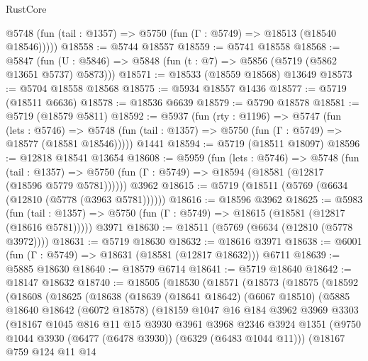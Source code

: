 \begin{lexlean}{RustCore}
\begin{coremodule}
      @5748 (fun (tail : @1357) => @5750 (fun (Γ : @5749) => @18513 (@18540 @18546)))))
@18558 := @5744 @18557
@18559 := @5741 @18558
@18568 := @5847
    (fun (U : @5846) => @5848 (fun (t : @7) => @5856 (@5719 (@5862 @13651 @5737) @5873)))
@18571 := @18533 (@18559 @18568) @13649
@18573 := @5704 @18558 @18568
@18575 := @5934 @18557 @1436
@18577 := @5719 (@18511 @6636)
@18578 := @18536 @6639
@18579 := @5790 @18578
@18581 := @5719 (@18579 @5811)
@18592 := @5937
    (fun (rty : @1196) =>
    @5747
      (fun (lets : @5746) =>
      @5748 (fun (tail : @1357) => @5750 (fun (Γ : @5749) => @18577 (@18581 @18546)))))
    @1441
@18594 := @5719 (@18511 @18097)
@18596 := @12818 @18541 @13654
@18608 := @5959
    (fun (lets : @5746) =>
    @5748
      (fun (tail : @1357) =>
      @5750 (fun (Γ : @5749) => @18594 (@18581 (@12817 (@18596 @5779 @5781))))))
    @3962
@18615 := @5719 (@18511 (@5769 (@6634 (@12810 (@5778 (@3963 @5781))))))
@18616 := @18596 @3962
@18625 := @5983
    (fun (tail : @1357) => @5750 (fun (Γ : @5749) => @18615 (@18581 (@12817 (@18616 @5781)))))
    @3971
@18630 := @18511 (@5769 (@6634 (@12810 (@5778 @3972))))
@18631 := @5719 @18630
@18632 := @18616 @3971
@18638 := @6001 (fun (Γ : @5749) => @18631 (@18581 (@12817 @18632))) @6711
@18639 := @5885 @18630
@18640 := @18579 @6714
@18641 := @5719 @18640
@18642 := @18147 @18632
@18740 := @18505
    (@18530
      (@18571
        (@18573
          (@18575
            (@18592
              (@18608
                (@18625
                  (@18638
                    (@18639
                      (@18641 @18642)
                      (@6067 @18510)
                      (@5885
                        @18640
                        @18642
                        (@6072 @18578)
                        (@18159
                          @1047
                          @16
                          @184
                          @3962
                          @3969
                          @3303
                          (@18167
                            @1045
                            @816
                            @11
                            @15
                            @3930
                            @3961
                            @3968
                            @2346
                            @3924
                            @1351
                            (@9750 @1044 @3930 (@6477 (@6478 @3930)) (@6329 (@6483 @1044 @11)))
                            (@18167
                              @759
                              @124
                              @11
                              @14

\end{coremodule}
\end{lexlean}
